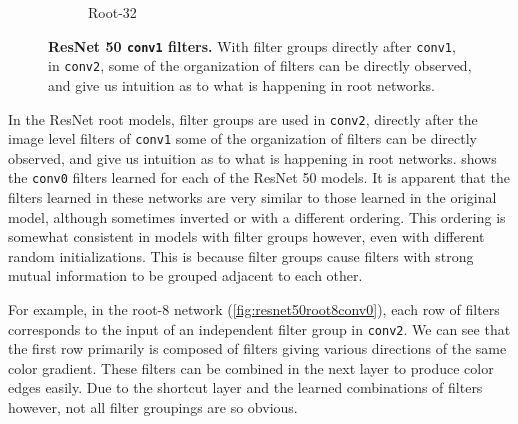 \documentclass[thesis]{subfiles}
\begin{document}
\begin{figure}[tb]
\begin{subfigure}[b]{0.45\textwidth}
			\caption{Root-32}
			\label{fig:resnet50root32conv0}
		\end{subfigure}
		\caption[ResNet 50 conv1 filters.]{\textbf{ResNet 50 \texttt{conv1} filters.} With filter groups directly after \texttt{conv1}, in \texttt{conv2}, some of the organization of filters can be directly observed, and give us intuition as to what is happening in root networks.}
		\label{fig:resnet50conv0}
	\end{figure}
	In the ResNet root models, filter groups are used in \texttt{conv2},  directly after the image level filters of \texttt{conv1} some of the organization of filters can be directly observed, and give us intuition as to what is happening in root networks.  shows the \texttt{conv0} filters learned for each of the ResNet 50 models. It is apparent that the filters learned in these networks are very similar to those learned in the original model, although sometimes inverted or with a different ordering. This ordering is somewhat consistent in models with filter groups however, even with different random initializations. This is because filter groups cause filters with strong mutual information to be grouped adjacent to each other.
	
	For example, in the root-8 network (\cref{fig:resnet50root8conv0}), each row of filters corresponds to the input of an independent filter group in \texttt{conv2}. We can see that the first row primarily is composed of filters giving various directions of the same color gradient. These filters can be combined in the next layer to produce color edges easily. Due to the shortcut layer and the learned combinations of filters however, not all filter groupings are so obvious.
	
\end{document}
